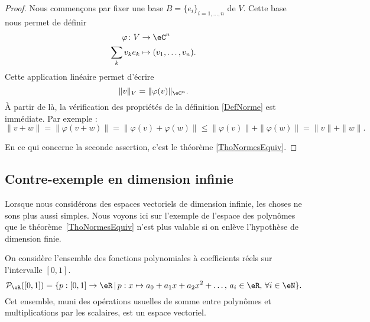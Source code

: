 \begin{proof}
    Nous commençons par fixer une base \( B=\{ e_i \}_{i=1,\ldots, n}\) de \( V\). Cette base nous permet de définir
    \begin{equation}
        \begin{aligned}
            \varphi\colon V&\to \eC^n \\
            \sum_kv_ke_k&\mapsto (v_1,\ldots, v_n). 
        \end{aligned}
    \end{equation}
    Cette application linéaire permet d'écrire
    \begin{equation}
        \| v \|_V=\| \varphi(v) \|_{\eC^n}.
    \end{equation}
    À partir de là, la vérification des propriétés de la définition \ref{DefNorme} est immédiate. Par exemple :
    \begin{equation}
        \| v+w \|=\| \varphi(v+w) \|=\| \varphi(v)+\varphi(w) \|\leq \| \varphi(v) \|+\| \varphi(w) \|=\| v \|+\| w \|.
    \end{equation}

    En ce qui concerne la seconde assertion, c'est le théorème \ref{ThoNormesEquiv}.
\end{proof}

\subsection{Contre-exemple en dimension infinie}
\label{SubSecPOlynomesCE}

Lorsque nous considérons des espaces vectoriels de dimension infinie, les choses ne sons plus aussi simples. Nous voyons ici sur l'exemple de l'espace des polynômes que le théorème~\ref{ThoNormesEquiv} n'est plus valable si on enlève l'hypothèse de dimension finie.

On considère l'ensemble des fonctions polynomiales à coefficients réels sur  l'intervalle $[0,1]$.
\begin{equation}
\mathcal{P}_\eR([0,1])=\{p:[0,1]\to \eR\,|\, p : x\mapsto a_0+a_1 x +a_2 x^2 + \ldots, \, a_i\in\eR,\,\forall i\in \eN\}.
\end{equation}
Cet ensemble, muni des opérations usuelles de somme entre polynômes et multiplications par les scalaires, est un espace vectoriel.

